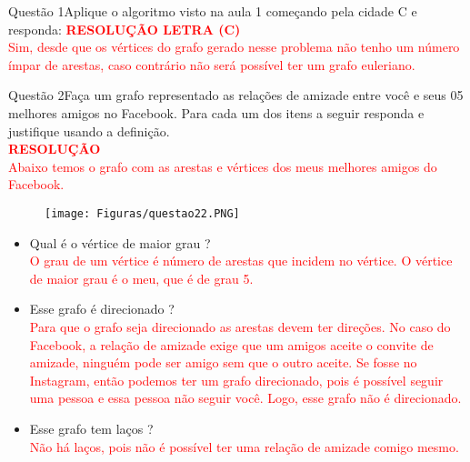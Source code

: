 \documentclass[12pt]{article}
\begin{document}
\begin{section}{Questão 1}{Aplique o algoritmo visto na aula 1 começando pela cidade C e responda:}
\noindent \textbf{\textcolor{red}{RESOLUÇÃO LETRA (C)}}\\

\noindent\textcolor{red}{Sim, desde que os vértices do grafo gerado nesse problema não tenho um número ímpar de arestas, caso contrário não será possível ter um grafo euleriano.}








\end{section}
\newpage
\begin{section}{Questão 2}{Faça um grafo representado as relações de amizade entre você e seus 05 melhores amigos no Facebook. Para cada um dos itens a seguir responda e justifique usando a definição.}\\

\noindent \textbf{\textcolor{red}{RESOLUÇÃO}}\\

\noindent \textcolor{red}{Abaixo temos o grafo com as arestas e vértices dos meus melhores amigos do Facebook.}\\

\begin{figure}[H]
    \centering
    \texttt{[image: Figuras/questao22.PNG]}
\end{figure}

\begin{itemize}
    \item[(a)] Qual é o vértice de maior grau ?\\
\noindent \textcolor{red}{O grau de um vértice é número de arestas que
incidem no vértice. O vértice de maior grau é o meu, que é de grau 5.}

    \item[(b)] Esse grafo é direcionado ?\\
\noindent \textcolor{red}{Para que o grafo seja direcionado as arestas devem ter direções. No caso do Facebook, a relação de amizade exige que um amigos aceite o convite de amizade, ninguém pode ser amigo sem que o outro aceite. Se fosse no Instagram, então podemos ter um grafo direcionado, pois é possível seguir uma pessoa e essa pessoa não seguir você. Logo, esse grafo não é direcionado.}
    
    \item[(c)] Esse grafo tem laços ?\\
\noindent \textcolor{red}{Não há laços, pois não é possível ter uma relação de amizade comigo mesmo.}
    

\end{itemize}
\end{section}
\end{document}
